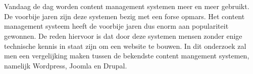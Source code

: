
%
%

%



\chapter*{}

Vandaag de dag worden content management systemen meer en meer gebruikt. De voorbije jaren zijn deze systemen bezig met een forse opmars. Het content management systeem heeft de voorbije jaren dus enorm aan populariteit gewonnen. De reden hiervoor is dat door deze systemen mensen zonder enige technische kennis in staat zijn om een website te bouwen. In dit onderzoek zal men een vergelijking maken tussen de bekendste content mangement systemen, namelijk Wordpress, Joomla en Drupal.

